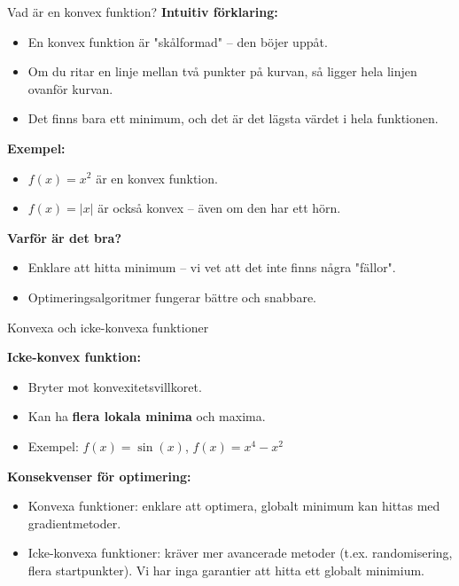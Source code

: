 \documentclass[10pt,english]{beamer}
\begin{document}
\begin{frame}{Vad är en konvex funktion?}
    \textbf{Intuitiv förklaring:}
    \begin{itemize}
        \item En konvex funktion är "skålformad" – den böjer uppåt.
        \item Om du ritar en linje mellan två punkter på kurvan, så ligger hela linjen ovanför kurvan.
        \item Det finns bara ett minimum, och det är det lägsta värdet i hela funktionen.
    \end{itemize}

    \vspace{0.4cm}
    \textbf{Exempel:}
    \begin{itemize}
        \item $f(x) = x^2$ är en konvex funktion.
        \item $f(x) = |x|$ är också konvex – även om den har ett hörn.
    \end{itemize}

    \vspace{0.4cm}
    \textbf{Varför är det bra?}
    \begin{itemize}
        \item Enklare att hitta minimum – vi vet att det inte finns några "fällor".
        \item Optimeringsalgoritmer fungerar bättre och snabbare.
    \end{itemize}
\end{frame}

\begin{frame}{Konvexa och icke-konvexa funktioner}

    \textbf{Icke-konvex funktion:}
    \begin{itemize}
        \item Bryter mot konvexitetsvillkoret.
        \item Kan ha \textbf{flera lokala minima} och maxima.
        \item Exempel: $f(x) = \sin(x)$, $f(x) = x^4 - x^2$
    \end{itemize}

    \vspace{0.3cm}
    \textbf{Konsekvenser för optimering:}
    \begin{itemize}
        \item Konvexa funktioner: enklare att optimera, globalt minimum kan hittas med gradientmetoder.
        \item Icke-konvexa funktioner: kräver mer avancerade metoder (t.ex. randomisering, flera startpunkter). Vi har inga garantier att hitta ett globalt minimium.
    \end{itemize}
\end{frame}
\end{document}
